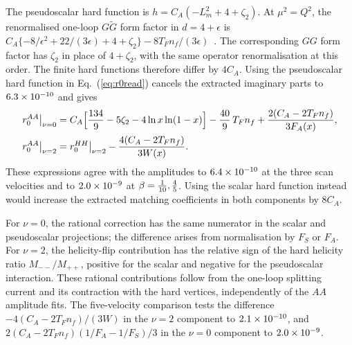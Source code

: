 \documentclass[%
 onecolumn,
 superscriptaddress,
 preprintnumbers,
 nofootinbib,
 amsmath,amssymb,
 aps,
 prl,
]{revtex4-2}
\begin{document}
The pseudoscalar hard function is
$h=C_A(-L_m^2+4+\zeta_2)$.
At $\mu^2=Q^2$, the renormalised
one-loop $G\widetilde G$ form factor
in $d=4+\epsilon$ is
$C_A\{-8/\epsilon^2+22/(3\epsilon)
+4+\zeta_2\}-8T_Fn_f/(3\epsilon)$~\cite{Ahmed:2015qpa}.
The corresponding $GG$ form factor
has $\zeta_2$ in place of
$4+\zeta_2$, with the same operator
renormalisation at this order.
The finite hard functions therefore
differ by $4C_A$.
%
Using the pseudoscalar hard function
in Eq.~(\ref{eq:r0read}) cancels the
extracted imaginary parts to
$6.3\times10^{-10}$ and gives
\begin{align}
r_0^{AA}\big|_{\nu=0}&=C_A\Big[\frac{134}9-5\zeta_2-4\ln x\ln(1-x)\Big]-\frac{40}9\,T_Fn_f
+\frac{2(C_A-2T_Fn_f)}{3F_A(x)},\notag\\
r_0^{AA}\big|_{\nu=2}&=r_0^{HH}\big|_{\nu=2}-\frac{4(C_A-2T_Fn_f)}{3W(x)}.
\label{eq:r0aa}
\end{align}
These expressions agree with the
amplitudes to $6.4\times10^{-10}$ at the three
scan velocities and to $2.0\times10^{-9}$
at $\beta=\frac{1}{10},\frac45$.
Using the scalar hard function instead
would increase the extracted matching
coefficients in both components by $8C_A$.

For $\nu=0$, the rational correction
has the same numerator in the scalar
and pseudoscalar projections; the
difference arises from normalisation
by $F_S$ or $F_A$.
For $\nu=2$, the helicity-flip
contribution has the relative sign
of the hard helicity ratio
$M_{--}/M_{++}$, positive for
the scalar and negative for the
pseudoscalar interaction.
%
These rational contributions follow
from the one-loop splitting current
and its contraction with the hard
vertices, independently of the
$AA$ amplitude fits.
The five-velocity comparison tests
the difference
$-4(C_A-2T_Fn_f)/(3W)$
in the $\nu=2$ component to
$2.1\times10^{-10}$, and
$2(C_A-2T_Fn_f)(1/F_A-1/F_S)/3$
in the $\nu=0$ component to
$2.0\times10^{-9}$.
\end{document}
